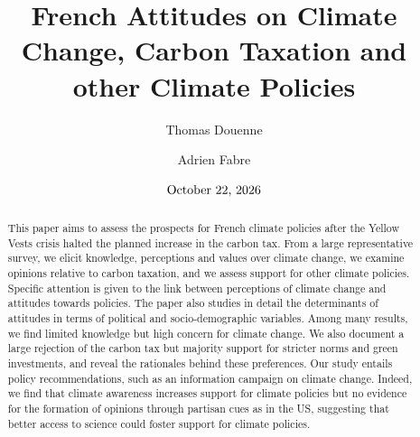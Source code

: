 \documentclass[english,5p,authoryear]{elsarticle}
\begin{document}
\sloppy

\date{$\textnormal{\today}$}

\begin{frontmatter}{}
%
  \title{French Attitudes on Climate Change, Carbon Taxation and other Climate Policies
%
  }

%

%
\author[1]{Thomas Douenne}
\author[1]{Adrien Fabre}
\address[1]{Paris School of Economics; Université Paris 1 Panthéon-Sorbonne. 48 Boulevard Jourdan, 75014, Paris, France.}


\begin{abstract}
This paper aims to assess the prospects for French climate policies after the Yellow Vests crisis halted the planned increase in the carbon tax. From a large representative survey, we elicit knowledge, perceptions and values over climate change, we examine opinions relative to carbon taxation, and we assess support for other climate policies. Specific attention is given to the link between perceptions of climate change and attitudes towards policies. The paper also studies in detail the determinants of attitudes in terms of political and socio-demographic variables. Among many results, we find limited knowledge but high concern for climate change. We also document a large rejection of the carbon tax but majority support for stricter norms and green investments, and reveal the rationales behind these preferences. Our study entails policy recommendations, such as an information campaign on climate change. Indeed, we find that climate awareness increases support for climate policies but no evidence for the formation of opinions through partisan cues as in the US, suggesting that better access to science could foster support for climate policies.
\end{abstract}
%

%

%

%

%


%

%

%

%

%

%

%


%

%

%


\end{frontmatter}
\end{document}
